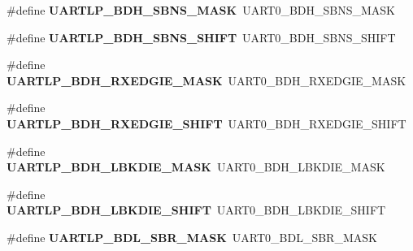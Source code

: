 \begin{DoxyCompactItemize}
\item 
\hypertarget{group___backward___compatibility___symbols_ga6fee92bf869c5fe7376bd4aca728d4bc}{}\#define {\bfseries U\+A\+R\+T\+L\+P\+\_\+\+B\+D\+H\+\_\+\+S\+B\+N\+S\+\_\+\+M\+A\+S\+K}~U\+A\+R\+T0\+\_\+\+B\+D\+H\+\_\+\+S\+B\+N\+S\+\_\+\+M\+A\+S\+K\label{group___backward___compatibility___symbols_ga6fee92bf869c5fe7376bd4aca728d4bc}

\item 
\hypertarget{group___backward___compatibility___symbols_gaaff5e47bbe5fd72ca58ec73c448a1962}{}\#define {\bfseries U\+A\+R\+T\+L\+P\+\_\+\+B\+D\+H\+\_\+\+S\+B\+N\+S\+\_\+\+S\+H\+I\+F\+T}~U\+A\+R\+T0\+\_\+\+B\+D\+H\+\_\+\+S\+B\+N\+S\+\_\+\+S\+H\+I\+F\+T\label{group___backward___compatibility___symbols_gaaff5e47bbe5fd72ca58ec73c448a1962}

\item 
\hypertarget{group___backward___compatibility___symbols_gad02c1fb9539a43c1fea5e16d23505cbd}{}\#define {\bfseries U\+A\+R\+T\+L\+P\+\_\+\+B\+D\+H\+\_\+\+R\+X\+E\+D\+G\+I\+E\+\_\+\+M\+A\+S\+K}~U\+A\+R\+T0\+\_\+\+B\+D\+H\+\_\+\+R\+X\+E\+D\+G\+I\+E\+\_\+\+M\+A\+S\+K\label{group___backward___compatibility___symbols_gad02c1fb9539a43c1fea5e16d23505cbd}

\item 
\hypertarget{group___backward___compatibility___symbols_ga9128322e4fc496b2e73502b8fe09062e}{}\#define {\bfseries U\+A\+R\+T\+L\+P\+\_\+\+B\+D\+H\+\_\+\+R\+X\+E\+D\+G\+I\+E\+\_\+\+S\+H\+I\+F\+T}~U\+A\+R\+T0\+\_\+\+B\+D\+H\+\_\+\+R\+X\+E\+D\+G\+I\+E\+\_\+\+S\+H\+I\+F\+T\label{group___backward___compatibility___symbols_ga9128322e4fc496b2e73502b8fe09062e}

\item 
\hypertarget{group___backward___compatibility___symbols_ga8e7625a181ceadbf341a36dfcb59db33}{}\#define {\bfseries U\+A\+R\+T\+L\+P\+\_\+\+B\+D\+H\+\_\+\+L\+B\+K\+D\+I\+E\+\_\+\+M\+A\+S\+K}~U\+A\+R\+T0\+\_\+\+B\+D\+H\+\_\+\+L\+B\+K\+D\+I\+E\+\_\+\+M\+A\+S\+K\label{group___backward___compatibility___symbols_ga8e7625a181ceadbf341a36dfcb59db33}

\item 
\hypertarget{group___backward___compatibility___symbols_gaeda76f3a18048d7d090663cff717da2c}{}\#define {\bfseries U\+A\+R\+T\+L\+P\+\_\+\+B\+D\+H\+\_\+\+L\+B\+K\+D\+I\+E\+\_\+\+S\+H\+I\+F\+T}~U\+A\+R\+T0\+\_\+\+B\+D\+H\+\_\+\+L\+B\+K\+D\+I\+E\+\_\+\+S\+H\+I\+F\+T\label{group___backward___compatibility___symbols_gaeda76f3a18048d7d090663cff717da2c}

\item 
\hypertarget{group___backward___compatibility___symbols_ga3a8fa23722acd6ab86121c94976e93f7}{}\#define {\bfseries U\+A\+R\+T\+L\+P\+\_\+\+B\+D\+L\+\_\+\+S\+B\+R\+\_\+\+M\+A\+S\+K}~U\+A\+R\+T0\+\_\+\+B\+D\+L\+\_\+\+S\+B\+R\+\_\+\+M\+A\+S\+K\label{group___backward___compatibility___symbols_ga3a8fa23722acd6ab86121c94976e93f7}


\end{DoxyCompactItemize}
